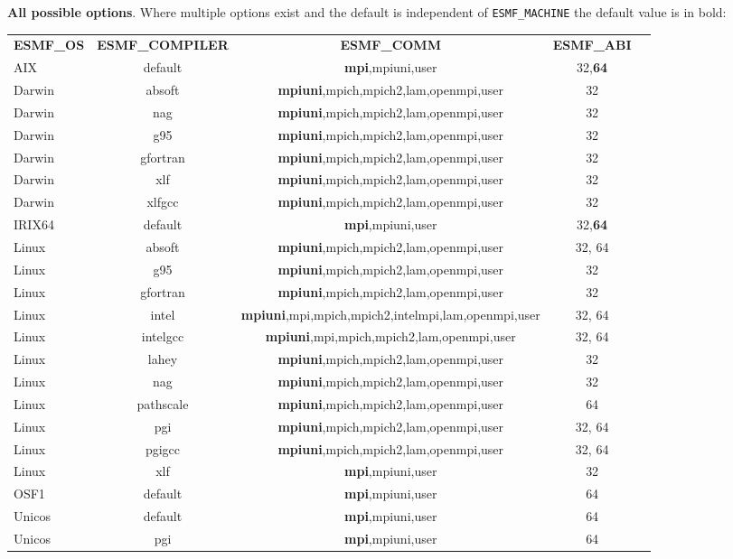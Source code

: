 \vspace{1ex}

{\bf All possible options}. Where multiple options exist 
and the default is independent of {\tt ESMF\_MACHINE} the default value is in bold:

\vspace{1ex}


\begin{tabular}{lcccc}
  {\bfseries ESMF\_OS} &{\bfseries ESMF\_COMPILER} & {\bfseries ESMF\_COMM} & {\bfseries ESMF\_ABI} \\

AIX     &  default      &  {\bf mpi},mpiuni,user         &  32,{\bf 64}  \\
Darwin  &  absoft       &  {\bf mpiuni},mpich,mpich2,lam,openmpi,user  &  32  \\
Darwin  &  nag          &  {\bf mpiuni},mpich,mpich2,lam,openmpi,user  &  32  \\
Darwin  &  g95          &  {\bf mpiuni},mpich,mpich2,lam,openmpi,user  &  32  \\
Darwin  &  gfortran     &  {\bf mpiuni},mpich,mpich2,lam,openmpi,user  &  32  \\
Darwin  &  xlf          &  {\bf mpiuni},mpich,mpich2,lam,openmpi,user  &  32  \\
Darwin  &  xlfgcc       &  {\bf mpiuni},mpich,mpich2,lam,openmpi,user  &  32  \\
IRIX64  &  default      &  {\bf mpi},mpiuni,user         &  32,{\bf 64}  \\
Linux   &  absoft       &  {\bf mpiuni},mpich,mpich2,lam,openmpi,user  &  32, 64 \\
Linux   &  g95          &  {\bf mpiuni},mpich,mpich2,lam,openmpi,user  &  32  \\
Linux   &  gfortran     &  {\bf mpiuni},mpich,mpich2,lam,openmpi,user  &  32  \\
Linux   &  intel        &  {\bf mpiuni},mpi,mpich,mpich2,intelmpi,lam,openmpi,user  &  32, 64 \\
Linux   &  intelgcc     &  {\bf mpiuni},mpi,mpich,mpich2,lam,openmpi,user  &  32, 64 \\
Linux   &  lahey        &  {\bf mpiuni},mpich,mpich2,lam,openmpi,user  &  32  \\
Linux   &  nag          &  {\bf mpiuni},mpich,mpich2,lam,openmpi,user  &  32  \\
Linux   &  pathscale    &  {\bf mpiuni},mpich,mpich2,lam,openmpi,user  &  64  \\
Linux   &  pgi          &  {\bf mpiuni},mpich,mpich2,lam,openmpi,user  &  32, 64  \\
Linux   &  pgigcc       &  {\bf mpiuni},mpich,mpich2,lam,openmpi,user  &  32, 64  \\
Linux   &  xlf          &  {\bf mpi},mpiuni,user         &  32  \\
OSF1    &  default      &  {\bf mpi},mpiuni,user         &  64  \\
Unicos  &  default      &  {\bf mpi},mpiuni,user         &  64  \\
Unicos  &  pgi          &  {\bf mpi},mpiuni,user         &  64

\end{tabular}

\vspace{1ex}

